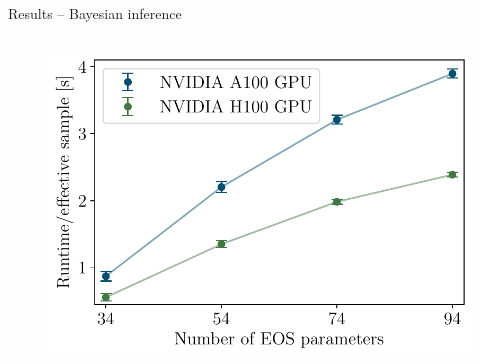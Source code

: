 \documentclass[usenames,dvipsnames,t]{beamer}
\begin{document}
\begin{frame}{Results -- Bayesian inference}
\begin{columns}
    \begin{figure}[htpb]
      \centering
      \includegraphics[width=0.975\linewidth]{Figures/scaling_plot.pdf}
    \end{figure}

  \end{columns}

\end{frame}
\end{document}
